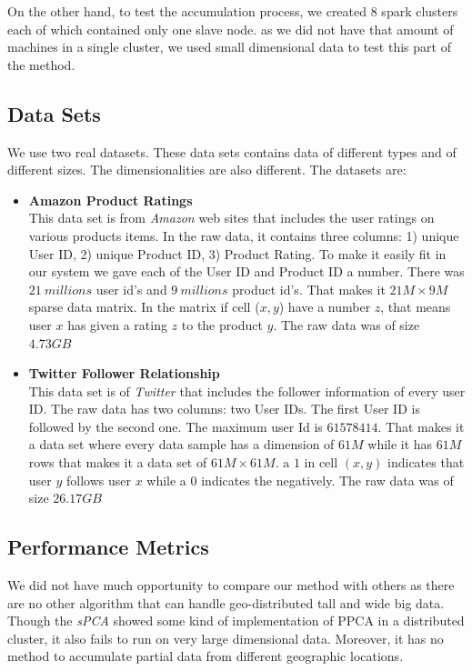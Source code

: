 \documentclass[10pt,conference,letterpaper]{IEEEtran}
\begin{document}
On the other hand, to test the accumulation process, we created 8 spark clusters each of which contained only one slave node. as we did not have that amount of machines in a single cluster, we used small dimensional data to test this part of the method.


\subsection{Data Sets}
We use two real datasets. These data sets contains data of different types and of different sizes. The dimensionalities are also different. The datasets are:

\begin{itemize}
\item \textbf{Amazon Product Ratings}\hspace*{\fill} \\
This data set is from \textit{Amazon} web sites that includes the user ratings on various products items. In the raw data, it contains three columns: 1) unique User ID, 2) unique Product ID, 3) Product Rating. To make it easily fit in our system we gave each of the User ID and Product ID a number. There was $21\ millions$ user id's and $9\ millions$ product id's. That makes it $21M \times 9M$ sparse data matrix. In the matrix if cell ($x,y$) have a number $z$, that means user $x$ has given a rating $z$ to the product $y$. The raw data was of size $4.73GB$
\item \textbf{Twitter Follower Relationship}\hspace*{\fill} \\
This data set is of \textit{Twitter} that includes the follower information of every user ID. The raw data has two columns: two User IDs. The first User ID is followed by the second one. The maximum user Id is $61578414$. That makes it a data set where every data sample has a dimension of $61M$ while it has $61M$ rows that makes it a data set of $61M \times 61M$. a $1$ in cell $(x,y)$ indicates that user $y$ follows user $x$ while a $0$ indicates the negatively. The raw data was of size $26.17GB$
\end{itemize}

\subsection{Performance Metrics}
We did not have much opportunity to compare our method with others as there are no other algorithm that can handle geo-distributed tall and wide big data. Though the \textit{sPCA} \cite{elgamal} showed some kind of implementation of PPCA in a distributed cluster, it also fails to run on very large dimensional data. Moreover, it has no method to accumulate partial data from different geographic locations. 
\end{document}
